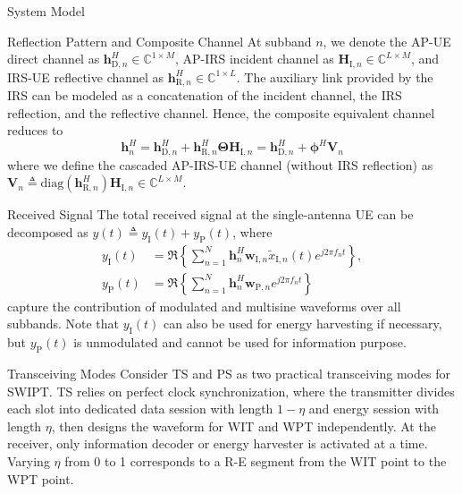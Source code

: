 \documentclass[journal]{IEEEtran}
\begin{document}
\begin{section}{System Model}
\begin{subsection}{Reflection Pattern and Composite Channel}
			At subband $n$, we denote the AP-UE direct channel as $\boldsymbol{h}_{\mathrm{D},n}^H \in \mathbb{C}^{1 \times M}$, AP-IRS incident channel as $\boldsymbol{H}_{\mathrm{I},n} \in \mathbb{C}^{L \times M}$, and IRS-UE reflective channel as $\boldsymbol{h}_{\mathrm{R},n}^H \in \mathbb{C}^{1 \times L}$. The auxiliary link provided by the IRS can be modeled as a concatenation of the incident channel, the IRS reflection, and the reflective channel. Hence, the composite equivalent channel reduces to
			\begin{equation}\label{eq:h_n}
				\boldsymbol{h}_{n}^H = \boldsymbol{h}_{\mathrm{D},n}^H + \boldsymbol{h}_{\mathrm{R},n}^H \boldsymbol{\Theta} \boldsymbol{H}_{\mathrm{I},n} = \boldsymbol{h}_{\mathrm{D},n}^H + \boldsymbol{\phi}^H \boldsymbol{V}_{n}
			\end{equation}
			where we define the cascaded AP-IRS-UE channel (without IRS reflection) as $\boldsymbol{V}_{n} \triangleq \mathrm{diag}(\boldsymbol{h}_{\mathrm{R},n}^H)\boldsymbol{H}_{\mathrm{I},n} \in \mathbb{C}^{L \times M}$.
		\end{subsection}


		\begin{subsection}{Received Signal}
			The total received signal at the single-antenna UE can be decomposed as $y(t) \triangleq y_{\mathrm{I}}(t)+y_\mathrm{P}(t)$, where
			\begin{align}
				y_{\mathrm{I}}(t) & = \Re\left\{\sum_{n=1}^N{\boldsymbol{h}_{n}^H}{\boldsymbol{w}_{\mathrm{I},n}\tilde{x}_{\mathrm{I},n}(t)}{e^{j2{\pi}{f_n}{t}}}\right\},\label{eq:y_I}\\
				y_{\mathrm{P}}(t) & = \Re\left\{\sum_{n=1}^N{\boldsymbol{h}_{n}^H}\boldsymbol{w}_{\mathrm{P},n}{e^{j2{\pi}{f_n}{t}}}\right\}\label{eq:y_P}
			\end{align}
			capture the contribution of modulated and multisine waveforms over all subbands. Note that $y_{\mathrm{I}}(t)$ can also be used for energy harvesting if necessary, but $y_{\mathrm{P}}(t)$ is unmodulated and cannot be used for information purpose.
		\end{subsection}


		\begin{subsection}{Transceiving Modes}
			Consider TS and PS as two practical transceiving modes for SWIPT. TS relies on perfect clock synchronization, where the transmitter divides each slot into dedicated data session with length $1 - \eta$ and energy session with length $\eta$, then designs the waveform for WIT and WPT independently. At the receiver, only information decoder or energy harvester is activated at a time. Varying $\eta$ from \num{0} to \num{1} corresponds to a R-E segment from the WIT point to the WPT point.


\end{subsection}
\end{section}
\end{document}
